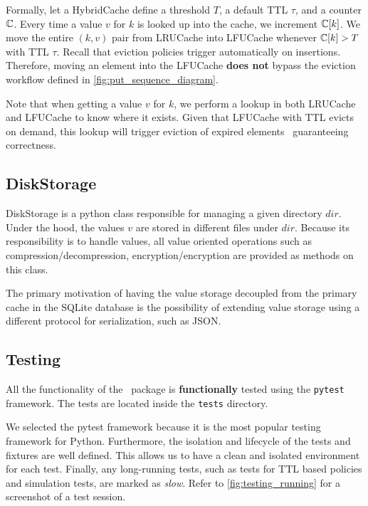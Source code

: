 Formally,
let a HybridCache define a threshold $T$, 
a default TTL $\tau$, and a counter $\operatorname{\mathbb{C}}$. Every time a
value $v$ for $k$ is looked up into the cache,
we increment $\operatorname{\mathbb{C}}[k]$. We move
the entire $(k, v)$ pair
from LRUCache into LFUCache 
whenever $\operatorname{\mathbb{C}}[k] > T$
with TTL $\tau$.
Recall that eviction policies trigger automatically
on insertions. Therefore, moving
an element into the LFUCache \textbf{does not}
bypass the eviction workflow defined in \autoref{fig:put_sequence_diagram}.

Note that when getting a value $v$ for $k$,
we perform a lookup in both LRUCache and LFUCache
to know where it exists. Given that LFUCache with TTL
evicts on demand, this lookup will trigger eviction
of expired elements \textemdash~guaranteeing
correctness.

\subsection{DiskStorage}
DiskStorage is a python class responsible for managing a given directory $dir$.
Under the hood, the values $v$ are stored in different files
under $dir$. Because its responsibility is to handle values,
all value oriented operations such as compression/decompression,
encryption/encryption are provided as methods on this class.

The primary motivation of having the value storage decoupled
from the primary cache in the SQLite database is the possibility
of extending value storage using a different protocol for serialization,
such as JSON.

\subsection{Testing}
All the functionality of the \sqlitecache~package is \textbf{functionally} tested using
the \texttt{pytest} framework. The tests are located inside the \texttt{tests} directory.

We selected the pytest framework because it is the most popular testing framework
for Python. Furthermore, the isolation and lifecycle of the tests and fixtures
are well defined. This allows us to have a clean and isolated environment
for each test. Finally, any long-running tests,
such as tests for TTL based policies and simulation tests,
are marked as \textit{slow}. Refer
to \autoref{fig:testing_running} for a
screenshot of a test session.

